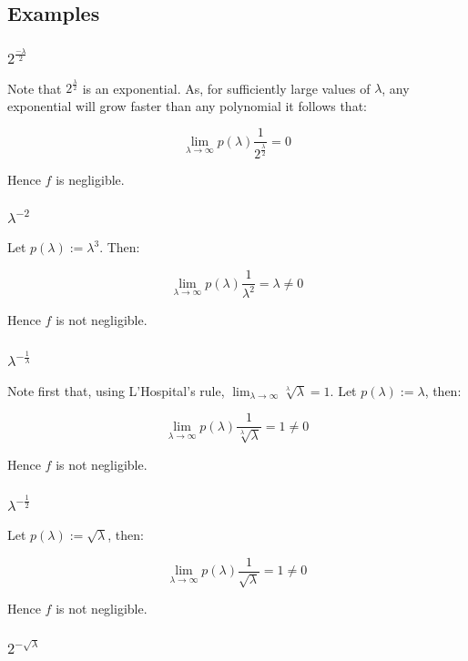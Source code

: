 \documentclass[a4paper]{scrreprt}
\begin{document}
\subsection{Examples}

\subsubsection{$2^{\frac{-\lambda}{2}}$}

Note that $2^{\frac{\lambda}{2}}$ is an exponential. As, for sufficiently large
values of $\lambda$, any exponential will grow faster than any polynomial it
follows that:

\[
	\lim_{\lambda \rightarrow \infty} p(\lambda) \frac{1}{2^{\frac{\lambda}{2}}} = 0
\]

Hence $f$ is negligible.

\subsubsection{$\lambda^{-2}$}

Let $p(\lambda) := \lambda^3$. Then:

\[
	\lim_{\lambda \rightarrow \infty} p(\lambda) \frac{1}{\lambda^2} = \lambda \neq 0
\]

Hence $f$ is not negligible.

\subsubsection{$\lambda^{-\frac{1}{\lambda}}$}

Note first that, using L'Hospital's rule, $\lim_{\lambda \rightarrow \infty}
\sqrt[\lambda]{\lambda} = 1$. Let $p(\lambda) := \lambda$, then:

\[
	\lim_{\lambda \rightarrow \infty} p(\lambda) \frac{1}{\sqrt[\lambda]{\lambda}} = 1 \neq 0
\]

Hence $f$ is not negligible.

\subsubsection{$\lambda^{-\frac{1}{2}}$}

Let $p(\lambda) := \sqrt{\lambda}$, then:

\[
	\lim_{\lambda \rightarrow \infty} p(\lambda) \frac{1}{\sqrt{\lambda}} = 1 \neq 0
\]

Hence $f$ is not negligible.

\subsubsection{$2^{-\sqrt{\lambda}}$}
\end{document}
